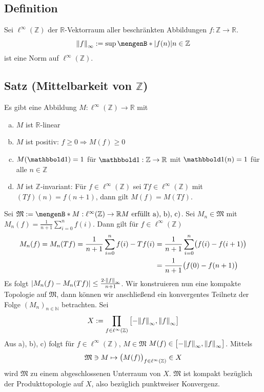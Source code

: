 \subsection[Definition: Vektorraum der beschränkten Abbildungen]{Definition} %
\label{sub:413}
Sei $\ell^\infty(\mathds{Z}) $ der $\mathds{R}$-Vektorraum aller beschränkten Abbildungen $f : \mathds{Z} \to \mathds{R}$.
\[
	\norm[\infty]{f} := \sup \set[\abs*{f(n)} ]{n \in \mathds{Z}}  
\]
ist eine Norm auf $\ell^\infty(\mathds{Z})$.

\subsection{Satz (Mittelbarkeit von $\mathds{Z}$)} %
\label{sub:414}
Es gibt eine Abbildung $M : \ell^\infty(\mathds{Z}) \to \mathds{R} $ mit
\begin{enumerate}[a)]
	\item $M$ ist $\mathds{R}$-linear
	\item $M$ ist positiv: $f \ge 0 \Rightarrow M(f) \ge 0$
	\item $M(\ind) =1$ für $\ind: \mathds{Z} \to \mathds{R}$ mit $\ind(n)=1$ für alle $n \in \mathds{Z}$
	\item $M$ ist $\mathds{Z}$-invariant: Für $f \in \ell^\infty(\mathds{Z}) $ sei $T f \in \ell^\infty(\mathds{Z})$ mit $(T f) (n) = f(n+1)$, dann gilt $M(f)= M(T f)$.
\end{enumerate}
Sei $\mathfrak{M} := \set[M : \ell^\infty(\mathds{Z}) \to \mathds{R}]{M \text{ erfüllt a), b), c)}} $. Sei $M_n \in \mathfrak{M}$ mit 
$M_n(f) = \frac{1}{n+1} \sum_{i=0}^{n} f(i) $. Dann gilt für $f \in \ell^\infty(\mathds{Z})$
\begin{align*}
	M_n(f)= M_n(T f) = \frac{1}{n+1} \sum_{i=0}^{n}  f(i) - T f(i) &= \frac{1}{n+1} \sum_{i=0}^{n} \enbrace[\big]{f(i)- f(i+1) } \\
	&=   \frac{1}{n+1} \enbrace[\big]{f(0)- f(n+1)} 
\end{align*}
Es folgt $\abs*{M_n(f) - M_n(T f)} \le \frac{2 \cdot \norm[\infty]{f} }{n+1}$. Wir konstruieren nun eine kompakte Topologie auf $\mathfrak{M}$, dann können wir anschließend
ein konvergentes Teilnetz der Folge $(M_n)_{n \in \mathds{N}}$ betrachten. Sei 
\[
	X := \prod_{f \in \ell^\infty(\mathds{Z})} \big[{- \norm[\infty]{f}}, \norm[\infty]{f} \big]
\]
Aus a), b), c) folgt für $f \in \ell^\infty(\mathds{Z})$, $M \in \mathfrak{M}$ $M(f) \in \big[{- \norm[\infty]{f}}, \norm[\infty]{f}\big]$. Mittels 
\[
	\mathfrak{M} \ni M \mapsto \enbrace[\big]{M(f)}_{f \in \ell^\infty(\mathds{Z})} \in X 
\]
wird $\mathfrak{M}$ zu einem abgeschlossenen Unterraum von $X$. $\mathfrak{M}$ ist 
kompakt bezüglich der Produkttopologie auf $X$, also bezüglich punktweiser Konvergenz.

